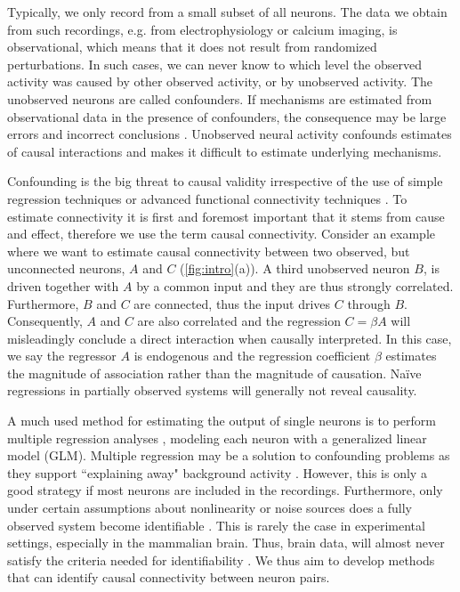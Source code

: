 \documentclass[11pt]{article}
\begin{document}
Typically, we only record from a small subset of all neurons. 
The data we obtain from such recordings, e.g. from electrophysiology or calcium imaging, is observational, which means that it does not result from randomized perturbations. 
In such cases, we can never know to which level the observed activity was caused by other observed activity, or by unobserved activity. 
The unobserved neurons are called confounders.
If mechanisms are estimated from observational data in the presence of confounders, the consequence may be large errors and incorrect conclusions \citep{angrist2008mostly}. 
Unobserved neural activity confounds estimates of causal interactions and makes it difficult to estimate underlying mechanisms.

Confounding is the big threat to causal validity \citep{UpcomingMehlerPaper} irrespective of the use of simple regression techniques or advanced functional connectivity techniques \citep{stevenson2008inferring, honey2009predicting, aitchison2017or, pfau2013robust}.  
To estimate connectivity it is first and foremost important that it stems from cause and effect, therefore we use the term causal connectivity. 
Consider an example where we want to estimate causal connectivity between two observed, but unconnected neurons, $ A $ and $ C $ (\cref{fig:intro}(a)). 
A third unobserved neuron $ B $, is driven together with $ A $ by a common input and they are thus strongly correlated.
Furthermore, $ B $ and $ C $ are connected, thus the input drives $ C $ through $ B $.
Consequently, $ A $ and $ C $ are also correlated and the regression $ C = \beta A $ will misleadingly conclude a direct interaction when causally interpreted. 
In this case, we say the regressor $ A $ is endogenous and the regression coefficient $ \beta $ estimates the magnitude of association rather than the magnitude of causation. 
Na\"ive regressions in partially observed systems will generally not reveal causality.

A much used method for estimating the output of single neurons is to perform multiple regression analyses \citep{pillow2008spatio}, modeling each neuron with a generalized linear model (GLM). 
Multiple regression may be a solution to confounding problems as they support ``explaining away" background activity \citep{stevenson2008inferring}.
However, this is only a good strategy if most neurons are included in the recordings.
Furthermore, only under certain assumptions about nonlinearity or noise sources does a fully observed system become identifiable \citep{daniusis2012inferring,shimizu2006linear}.
This is rarely the case in experimental settings, especially in the mammalian brain.
Thus, brain data, will almost never satisfy the criteria needed for identifiability \citep{pearl2009causality}. 
We thus aim to develop methods that can identify causal connectivity between neuron pairs.
\end{document}
